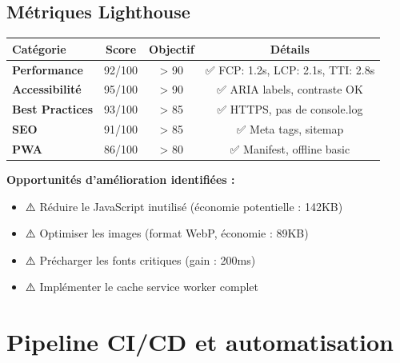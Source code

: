 \subsection{Métriques Lighthouse}

\begin{tcolorbox}[colback=blue!5!white,colframe=blue!60!black,title=\textbf{Scores Lighthouse - My Smart Budget (Mobile 4G)}]
\begin{center}
\begin{tabular}{|l|c|c|c|}
\hline
\textbf{Catégorie} & \textbf{Score} & \textbf{Objectif} & \textbf{Détails} \\
\hline
\textbf{Performance} & 92/100 & > 90 & ✅ FCP: 1.2s, LCP: 2.1s, TTI: 2.8s \\
\textbf{Accessibilité} & 95/100 & > 90 & ✅ ARIA labels, contraste OK \\
\textbf{Best Practices} & 93/100 & > 85 & ✅ HTTPS, pas de console.log \\
\textbf{SEO} & 91/100 & > 85 & ✅ Meta tags, sitemap \\
\textbf{PWA} & 86/100 & > 80 & ✅ Manifest, offline basic \\
\hline
\end{tabular}
\end{center}

\textbf{Opportunités d'amélioration identifiées :}
\begin{itemize}
    \item ⚠️ Réduire le JavaScript inutilisé (économie potentielle : 142KB)
    \item ⚠️ Optimiser les images (format WebP, économie : 89KB)
    \item ⚠️ Précharger les fonts critiques (gain : 200ms)
    \item ⚠️ Implémenter le cache service worker complet
\end{itemize}
\end{tcolorbox}

\section{Pipeline CI/CD et automatisation}

